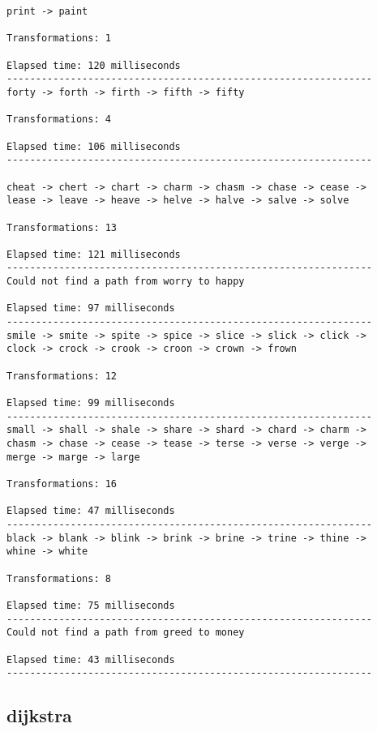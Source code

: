 \documentclass{article}
\begin{document}
\vspace{0.2cm}

\begin{verbatim}
print -> paint

Transformations: 1

Elapsed time: 120 milliseconds
---------------------------------------------------------------
forty -> forth -> firth -> fifth -> fifty

Transformations: 4

Elapsed time: 106 milliseconds
---------------------------------------------------------------

cheat -> chert -> chart -> charm -> chasm -> chase -> cease ->
lease -> leave -> heave -> helve -> halve -> salve -> solve

Transformations: 13

Elapsed time: 121 milliseconds
---------------------------------------------------------------
Could not find a path from worry to happy

Elapsed time: 97 milliseconds
---------------------------------------------------------------
smile -> smite -> spite -> spice -> slice -> slick -> click ->
clock -> crock -> crook -> croon -> crown -> frown

Transformations: 12

Elapsed time: 99 milliseconds
---------------------------------------------------------------
small -> shall -> shale -> share -> shard -> chard -> charm ->
chasm -> chase -> cease -> tease -> terse -> verse -> verge ->
merge -> marge -> large

Transformations: 16

Elapsed time: 47 milliseconds
---------------------------------------------------------------
black -> blank -> blink -> brink -> brine -> trine -> thine ->
whine -> white

Transformations: 8

Elapsed time: 75 milliseconds
---------------------------------------------------------------
Could not find a path from greed to money

Elapsed time: 43 milliseconds
---------------------------------------------------------------
\end{verbatim}

\newpage

\subsection*{dijkstra}
\end{document}
